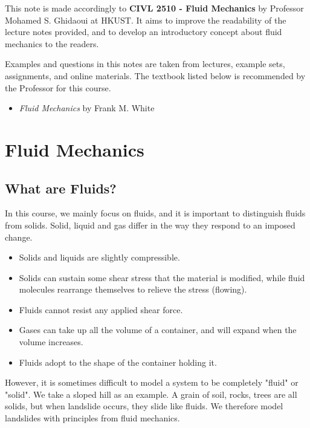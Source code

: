 \documentclass[twoside]{article}
\numberwithin{equation}{section}
\begin{document}
	\newpage
	
	\pagestyle{fancy}
	\fancyhf{}
	\renewcommand{\headrulewidth}{0pt}
	
	\fancyfoot{}
	\fancyfoot[RO, LE]{\thepage}
	
	\setcounter{page}{1}
	
	This note is made accordingly to \textbf{CIVL 2510 - Fluid Mechanics} by Professor Mohamed S. Ghidaoui at HKUST. It aims to improve the readability of the lecture notes provided, and to develop an introductory concept about fluid mechanics to the readers.
	
	Examples and questions in this notes are taken from lectures, example sets, assignments, and online materials. The textbook listed below is recommended by the Professor for this course.
	\begin{itemize}
		\item \emph{Fluid Mechanics} by Frank M. White
	\end{itemize}
	
	\newpage
	
	\tableofcontents
	
	\newpage
	
	\section{Fluid Mechanics}
	\label{sec:FluidMechanics}
	
	\subsection{What are Fluids?}
	\label{subsec:WhatAreFluids}
	
	In this course, we mainly focus on fluids, and it is important to distinguish fluids from solids. Solid, liquid and gas differ in the way they respond to an imposed change.
	\begin{itemize}
		\item Solids and liquids are slightly compressible.
		\item Solids can sustain some shear stress that the material is modified, while fluid molecules rearrange themselves to relieve the stress (flowing).
		\item Fluids cannot resist any applied shear force.
		\item Gases can take up all the volume of a container, and will expand when the volume increases.
		\item Fluids adopt to the shape of the container holding it.
	\end{itemize}
	However, it is sometimes difficult to model a system to be completely "fluid" or "solid". We take a sloped hill as an example. A grain of soil, rocks, trees are all solids, but when landslide occurs, they slide like fluids. We therefore model landslides with principles from fluid mechanics.
	
\end{document}
